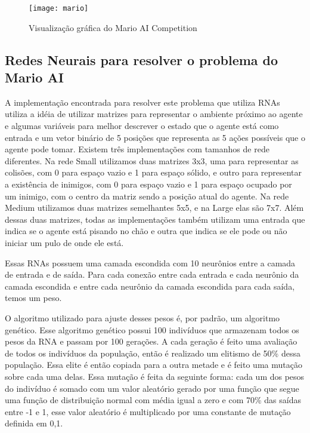 \documentclass[a4paper,12pt]{article}
\begin{document}
      \begin{figure}[!htb]
	\centering
	\texttt{[image: mario]}
	\caption{Visualização gráfica do Mario AI Competition}
	\label{Figura 1}
      \end{figure}

    \subsection{Redes Neurais para resolver o problema do Mario AI}
    
      A implementação encontrada para resolver este problema que utiliza RNAs utiliza a idéia 
      de utilizar matrizes para representar o ambiente próximo ao agente e algumas variáveis 
      para melhor descrever o estado que o agente está como entrada e um vetor binário de 5 
      posições que representa as 5 ações possíveis que o agente pode tomar.
      Existem três implementações com tamanhos de rede diferentes. Na rede Small utilizamos 
      duas matrizes 3x3, uma para representar as colisões, com 0 para espaço vazio e 1 para 
      espaço sólido, e outro para representar a existência de inimigos, com 0 para espaço vazio 
      e 1 para espaço ocupado por um inimigo, com o centro da matriz sendo a posição atual do 
      agente. Na rede Medium utilizamos duas matrizes semelhantes 5x5, e na Large elas são 7x7. 
      Além dessas duas matrizes, todas as implementações também utilizam uma entrada que indica 
      se o agente está pisando no chão e outra que indica se ele pode ou não iniciar um pulo de 
      onde ele está.
    
      Essas RNAs possuem uma camada escondida com 10 neurônios entre a camada de entrada e de 
      saída. Para cada conexão entre cada entrada e cada neurônio da camada escondida e entre cada 
      neurônio da camada escondida para cada saída, temos um peso.
      
      O algoritmo utilizado para ajuste desses pesos é, por padrão, um algoritmo genético. Esse 
      algoritmo genético possui 100 indivíduos que armazenam todos os pesos da RNA e passam por 100 
      gerações. A cada geração é feito uma avaliação de todos os indivíduos da população, então é 
      realizado um elitismo de 50\% dessa população. Essa elite é então copiada para a outra 
      metade e é feito uma mutação sobre cada uma delas. Essa mutação é feita da seguinte forma: 
      cada um dos pesos do indivíduo é somado com um valor aleatório gerado por uma função que 
      segue uma função de distribuição normal com média igual a zero e com 70\% das saídas 
      entre -1 e 1, esse valor aleatório é multiplicado por uma constante de mutação definida 
      em 0,1.
    
\end{document}
